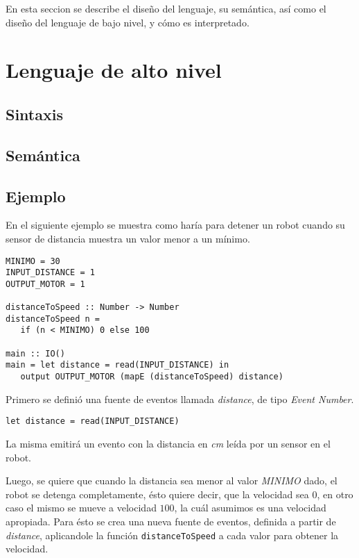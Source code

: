 En esta seccion se describe el diseño del lenguaje, su semántica,
así como el diseño del lenguaje de bajo nivel, y cómo es interpretado.

\section{Lenguaje de alto nivel}

\subsection{Sintaxis}

\subsection{Semántica}


\subsection{Ejemplo}

En el siguiente ejemplo se muestra como haría para detener un
robot cuando su sensor de distancia muestra un valor menor a un mínimo.

\begin{verbatim}
MINIMO = 30
INPUT_DISTANCE = 1
OUTPUT_MOTOR = 1

distanceToSpeed :: Number -> Number
distanceToSpeed n =
   if (n < MINIMO) 0 else 100

main :: IO()
main = let distance = read(INPUT_DISTANCE) in
   output OUTPUT_MOTOR (mapE (distanceToSpeed) distance)

\end{verbatim}

Primero se definió una fuente de eventos llamada \emph{distance},
de tipo \emph{Event Number}.

\begin{verbatim}
let distance = read(INPUT_DISTANCE)
\end{verbatim}

La misma emitirá un evento con la distancia en \emph{cm} leída
por un sensor en el robot.

  Luego, se quiere que cuando la distancia sea menor al valor
\emph{MINIMO} dado, el robot se detenga completamente, ésto
quiere decir, que la velocidad sea $0$, en otro caso el mismo
se mueve a velocidad $100$, la cuál asumimos es una velocidad
apropiada.
  Para ésto se crea una nueva fuente de eventos, definida a partir
de \emph{distance}, aplicandole la función \texttt{distanceToSpeed} 
a cada valor para obtener la velocidad.

